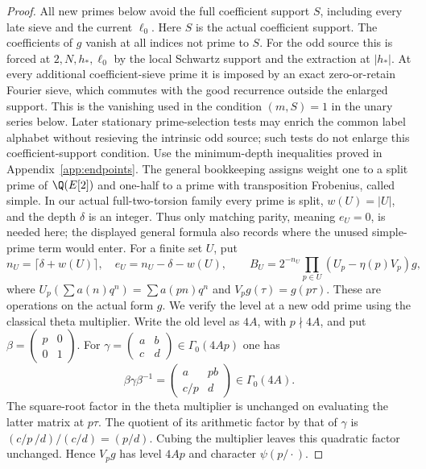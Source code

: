 \begin{proof}\leavevmode
All new primes below avoid the full coefficient support $S$,
including every late sieve and the current $\ell_0$.
Here $S$ is the actual coefficient support.  The coefficients of
$g$ vanish at all indices not prime to $S$.
For the odd source this is forced at $2,N,h_*,\ell_0$ by the
local Schwartz support and the extraction at $|h_*|$.
At every additional coefficient-sieve prime it is imposed by an
exact zero-or-retain Fourier sieve, which commutes with the good
recurrence outside the enlarged support.  This is the vanishing
used in the condition $(m,S)=1$ in the unary series below.
Later stationary prime-selection tests may enrich the common
label alphabet without resieving the intrinsic odd source;
such tests do not enlarge this coefficient-support condition.
Use the minimum-depth inequalities proved in Appendix~\ref{app:endpoints}.
The general bookkeeping assigns weight one to a split prime of
$\Q(E[2])$ and one-half to a prime with transposition Frobenius, called
simple. In our actual full-two-torsion family every prime is split,
$w(U)=|U|$, and the depth $\delta$ is an integer. Thus only matching
parity, meaning $e_U=0$, is needed here; the displayed general formula
also records where the unused simple-prime term would enter.
For a finite set $U$, put
\[
 n_U=\lceil\delta+w(U)\rceil,\quad e_U=n_U-\delta-w(U),\qquad
 B_U=2^{-n_U}\prod_{p\in U}(U_p-\eta(p)V_p)g,
\]
where $U_p(\sum a(n)q^n)=\sum a(pn)q^n$ and $V_pg(\tau)=g(p\tau)$.
These are operations on the actual form $g$. We verify the level
at a new odd prime using the classical theta multiplier. Write the
old level as $4A$, with $p\nmid4A$, and put
$\beta=\left(\begin{smallmatrix}p&0\\0&1\end{smallmatrix}\right)$.
For $\gamma=\left(\begin{smallmatrix}a&b\\c&d\end{smallmatrix}\right)
\in\Gamma_0(4Ap)$ one has
\[
 \beta\gamma\beta^{-1}=
       \begin{pmatrix}a&pb\\c/p&d\end{pmatrix}\in\Gamma_0(4A).
\]
The square-root factor in the theta multiplier is unchanged on
evaluating the latter matrix at $p\tau$. The quotient of its
arithmetic factor by that of $\gamma$ is
$(c/p\,/d)/(c/d)=(p/d)$. Cubing the multiplier leaves this
quadratic factor unchanged. Hence $V_pg$ has level $4Ap$ and
character $\psi(p/\cdot)$.


\end{proof}
